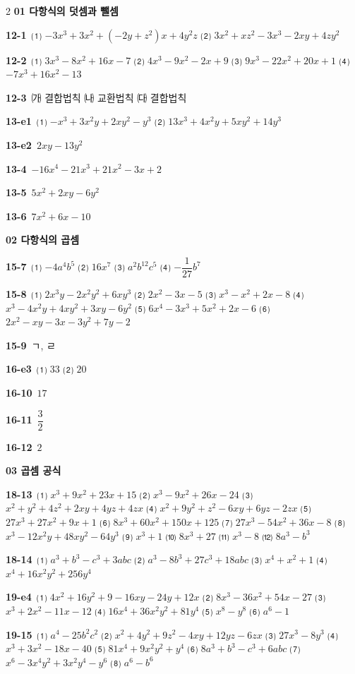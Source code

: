 \documentclass[10pt,a4paper]{article}
\begin{document}
\begin{multicols}{2}\small
\noindent\textbf{01 다항식의 덧셈과 뺄셈}\par\smallskip
\noindent\textbf{12-1}\ ⑴ $-3x^3+3x^2+(-2y+z^2)x+4y^2z$ ⑵ $3x^2+xz^2-3x^3-2xy+4zy^2$\par
\noindent\textbf{12-2}\ ⑴ $3x^3-8x^2+16x-7$ ⑵ $4x^3-9x^2-2x+9$ ⑶ $9x^3-22x^2+20x+1$ ⑷ $-7x^3+16x^2-13$\par
\noindent\textbf{12-3}\ ㈎ 결합법칙 ㈏ 교환법칙 ㈐ 결합법칙\par
\noindent\textbf{13-e1}\ ⑴ $-x^3+3x^2y+2xy^2-y^3$ ⑵ $13x^3+4x^2y+5xy^2+14y^3$\par
\noindent\textbf{13-e2}\ $2xy-13y^2$\par
\noindent\textbf{13-4}\ $-16x^4-21x^3+21x^2-3x+2$\par
\noindent\textbf{13-5}\ $5x^2+2xy-6y^2$\par
\noindent\textbf{13-6}\ $7x^2+6x-10$\par
\noindent\textbf{02 다항식의 곱셈}\par\smallskip
\noindent\textbf{15-7}\ ⑴ $-4a^4b^5$ ⑵ $16x^7$ ⑶ $a^2b^{12}c^5$ ⑷ $-\dfrac{1}{27}b^7$\par
\noindent\textbf{15-8}\ ⑴ $2x^3y-2x^2y^2+6xy^3$ ⑵ $2x^2-3x-5$ ⑶ $x^3-x^2+2x-8$ ⑷ $x^3-4x^2y+4xy^2+3xy-6y^2$ ⑸ $6x^4-3x^3+5x^2+2x-6$ ⑹ $2x^2-xy-3x-3y^2+7y-2$\par
\noindent\textbf{15-9}\ ㄱ, ㄹ\par
\noindent\textbf{16-e3}\ ⑴ $33$ ⑵ $20$\par
\noindent\textbf{16-10}\ $17$\par
\noindent\textbf{16-11}\ $\dfrac{3}{2}$\par
\noindent\textbf{16-12}\ $2$\par
\noindent\textbf{03 곱셈 공식}\par\smallskip
\noindent\textbf{18-13}\ ⑴ $x^3+9x^2+23x+15$ ⑵ $x^3-9x^2+26x-24$ ⑶ $x^2+y^2+4z^2+2xy+4yz+4zx$ ⑷ $x^2+9y^2+z^2-6xy+6yz-2zx$ ⑸ $27x^3+27x^2+9x+1$ ⑹ $8x^3+60x^2+150x+125$ ⑺ $27x^3-54x^2+36x-8$ ⑻ $x^3-12x^2y+48xy^2-64y^3$ ⑼ $x^3+1$ ⑽ $8x^3+27$ ⑾ $x^3-8$ ⑿ $8a^3-b^3$\par
\noindent\textbf{18-14}\ ⑴ $a^3+b^3-c^3+3abc$ ⑵ $a^3-8b^3+27c^3+18abc$ ⑶ $x^4+x^2+1$ ⑷ $x^4+16x^2y^2+256y^4$\par
\noindent\textbf{19-e4}\ ⑴ $4x^2+16y^2+9-16xy-24y+12x$ ⑵ $8x^3-36x^2+54x-27$ ⑶ $x^3+2x^2-11x-12$ ⑷ $16x^4+36x^2y^2+81y^4$ ⑸ $x^8-y^8$ ⑹ $a^6-1$\par
\noindent\textbf{19-15}\ ⑴ $a^4-25b^2c^2$ ⑵ $x^2+4y^2+9z^2-4xy+12yz-6zx$ ⑶ $27x^3-8y^3$ ⑷ $x^3+3x^2-18x-40$ ⑸ $81x^4+9x^2y^2+y^4$ ⑹ $8a^3+b^3-c^3+6abc$ ⑺ $x^6-3x^4y^2+3x^2y^4-y^6$ ⑻ $a^6-b^6$\par

\end{multicols}
\end{document}
